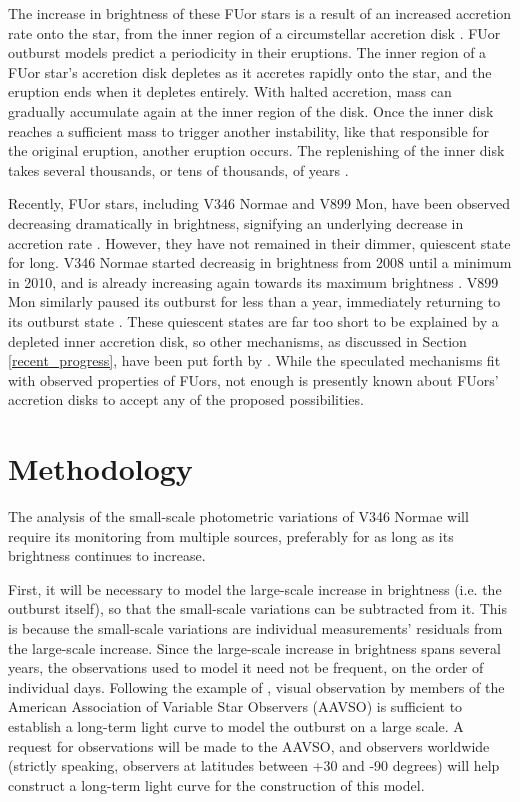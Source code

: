 \documentclass[iop,apj,tighten]{emulateapj}
\begin{document}
The increase in brightness of these FUor stars is a result of an increased accretion rate onto the star, from the inner region of a circumstellar accretion disk \citep{turner_models_1997}. FUor outburst models predict a periodicity in their eruptions. The inner region of a FUor star's accretion disk depletes as it accretes rapidly onto the star, and the eruption ends when it depletes entirely. With halted accretion, mass can gradually accumulate again at the inner region of the disk. Once the inner disk reaches a sufficient mass to trigger another instability, like that responsible for the original eruption, another eruption occurs. The replenishing of the inner disk takes several thousands, or tens of thousands, of years \citep{bell1993using}.

Recently, FUor stars, including V346 Normae and V899 Mon, have been observed decreasing dramatically in brightness, signifying an underlying decrease in accretion rate \cite{kraus_v346_2016,ninan2015v899}. However, they have not remained in their dimmer, quiescent state for long. V346 Normae started decreasig in brightness from 2008 until a minimum in 2010, and is already increasing again towards its maximum brightness \citep{kospal2017brightness}. V899 Mon similarly paused its outburst for less than a year, immediately returning to its outburst state \citep{ninan2015v899}. These quiescent states are far too short to be explained by a depleted inner accretion disk, so other mechanisms, as discussed in Section \ref{recent_progress}, have been put forth by \cite{ninan2015v899}. While the speculated mechanisms fit with observed properties of FUors, not enough is presently known about FUors' accretion disks to accept any of the proposed possibilities.

\section{Methodology}
The analysis of the small-scale photometric variations of V346 Normae will require its monitoring from multiple sources, preferably for as long as its brightness continues to increase. 

First, it will be necessary to model the large-scale increase in brightness (i.e. the outburst itself), so that the small-scale variations can be subtracted from it. This is because the small-scale variations are individual measurements' residuals from the large-scale increase. Since the large-scale increase in brightness spans several years, the observations used to model it need not be frequent, on the order of individual days. Following the example of \cite{kenyon_flickering_2000}, visual observation by members of the American Association of Variable Star Observers (AAVSO) is sufficient to establish a long-term light curve to model the outburst on a large scale. A request for observations will be made to the AAVSO, and observers worldwide (strictly speaking, observers at latitudes between +30 and -90 degrees) will help construct a long-term light curve for the construction of this model. 
\end{document}
